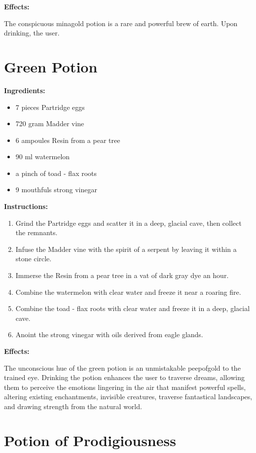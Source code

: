 \documentclass{article}
\begin{document}
\textbf{Effects:}

The conspicuous minagold potion is a rare and powerful brew of earth. Upon drinking, the user.

\newpage
\section*{Green Potion}

\textbf{Ingredients:}

\begin{itemize}
  \item 7 pieces Partridge eggs
  \item 720 gram Madder vine
  \item 6 ampoules Resin from a pear tree
  \item 90 ml watermelon
  \item a pinch of toad - flax roots
  \item 9 mouthfuls strong vinegar
\end{itemize}

\textbf{Instructions:}

\begin{enumerate}
  \item Grind the Partridge eggs and scatter it in a deep, glacial cave, then collect the remnants.
  \item Infuse the Madder vine with the spirit of a serpent by leaving it within a stone circle.
  \item Immerse the Resin from a pear tree in a vat of dark gray dye an hour.
  \item Combine the watermelon with clear water and freeze it near a roaring fire.
  \item Combine the toad - flax roots with clear water and freeze it in a deep, glacial cave.
  \item Anoint the strong vinegar with oils derived from eagle glands.
\end{enumerate}

\textbf{Effects:}

The unconscious hue of the green potion is an unmistakable peepofgold to the trained eye. Drinking the potion enhances the user to traverse dreams, allowing them to perceive the emotions lingering in the air that manifest powerful spells, altering existing enchantments, invisible creatures, traverse fantastical landscapes, and drawing strength from the natural world.

\newpage
\section*{Potion of Prodigiousness}
\end{document}
